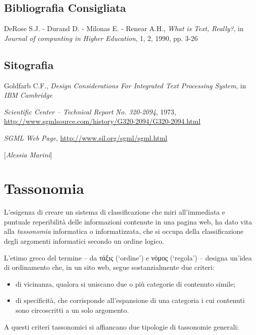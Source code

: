 {\section*{Bibliografia Consigliata}
{\parindent0pt 
DeRose S.J. - Durand D. - Milonas E. - Renear A.H., \emph{What is Text,
Really?}, in \emph{Journal of compunting in Higher Education}, 1, 2,
1990, pp. 3-26
}

\section*{Sitografia}
{\parindent0pt 
Goldfarb C.F., \emph{Design Considerations For Integrated Text
Processing System}, in \emph{IBM Cambridge }

\emph{Scientific Center -- Technical Report} \emph{No. 320-2094}, 1973,
\url{http://www.sgmlsource.com/history/G320-2094/G320-2094.html}


\emph{SGML Web Page},
\url{http://www.sil.org/sgml/sgml.html}
}

\hrulefill 
 
{[}\emph{Alessia Marini}{]}



\chapter{Tassonomia}

L'esigenza di creare un sistema di classificazione che miri
all'immediata e puntuale reperibilità delle informazioni contenute in
una pagina web, ha dato vita alla \emph{tassonomia} informatica o
informatizzata, che si occupa della classificazione degli argomenti
informatici secondo un ordine logico.

L'etimo greco del termine -- da τάξις (`ordine') e νόμος (`regola') --
designa un'idea di ordinamento che, in un sito web, segue
sostanzialmente due criteri:

\begin{itemize}
\item
  di vicinanza, qualora si uniscano due o più categorie di contenuto
  simile;
\item
  di specificità, che corrisponde all'espansione di una categoria i cui
  contenuti sono circoscritti a un solo argomento.
\end{itemize}

A questi criteri tassonomici si affiancano due tipologie di tassonomie
generali:

}
